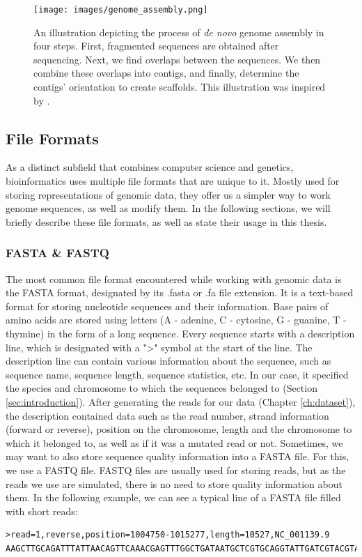 \documentclass[times, utf8, diplomski, english]{fer_eng}
\begin{document}
\begin{figure}
	\centering
	\texttt{[image: images/genome\_assembly.png]}
	\caption[Genome assembly]{An illustration depicting the process of \textit{de novo} genome assembly in four steps. First, fragmented sequences are obtained after sequencing. Next, we find overlaps between the sequences. We then combine these overlaps into contigs, and finally, determine the contigs' orientation to create scaffolds. This illustration was inspired by \cite{baker_2012}.}
	\label{fig:genome assembly}
\end{figure}

\subsection{File Formats}
\label{subsec:file formats}

As a distinct subfield that combines computer science and genetics, bioinformatics uses multiple file formats that are unique to it. Mostly used for storing representations of genomic data, they offer us a simpler way to work genome sequences, as well as modify them. In the following sections, we will briefly describe these file formats, as well as state their usage in this thesis.

\subsubsection{FASTA \& FASTQ}
\label{subsubsec:fasta and fastq}

The most common file format encountered while working with genomic data is the FASTA format, designated by its .fasta or .fa file extension. It is a text-based format for storing nucleotide sequences and their information. Base pairs of amino acids are stored using letters (A - adenine, C - cytosine, G - guanine, T - thymine) in the form of a long sequence. Every sequence starts with a description line, which is designated with a ">" symbol at the start of the line. The description line can contain various information about the sequence, such as sequence name, sequence length, sequence statistics, etc. In our case, it specified the species and chromosome to which the sequences belonged to (Section \ref{sec:introduction}). After generating the reads for our data (Chapter \ref{ch:dataset}), the description contained data such as the read number, strand information (forward or reverse), position on the chromosome, length and the chromosome to which it belonged to, as well as if it was a mutated read or not. Sometimes, we may want to also store sequence quality information into a FASTA file. For this, we use a FASTQ file. FASTQ files are usually used for storing reads, but as the reads we use are simulated, there is no need to store quality information about them. In the following example, we can see a typical line of a FASTA file filled with short reads:
\begin{lstlisting}
>read=1,reverse,position=1004750-1015277,length=10527,NC_001139.9
AAGCTTGCAGATTTATTAACAGTTCAAACGAGTTTGGCTGATAATGCTCGTGCAGGTATTGATCGTACGTACGTAGCTACGTG
\end{lstlisting}
\end{document}
